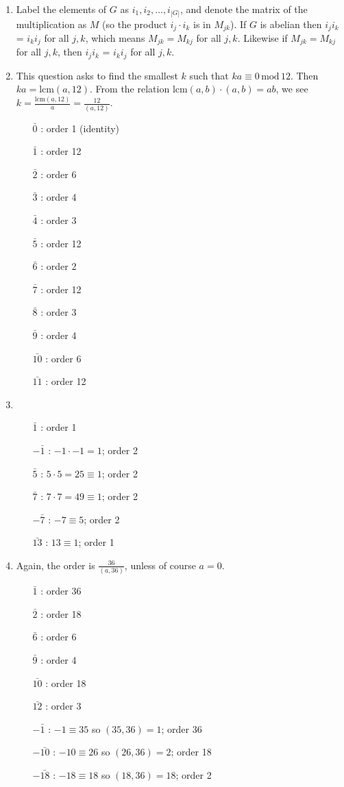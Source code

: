 \documentclass[]{article}
\newcommand{\abs}[1]{\left\vert #1 \right\vert}
\newcommand{\md}{\,\text{mod}\,}
\begin{document}
\begin{enumerate}
\item Label the elements of $G$ as $i_1, i_2, \ldots, i_{\abs{G}}$, and denote the matrix of the multiplication as $M$ (so the product $i_j\cdot i_k$ is in $M_{jk}$). If $G$ is abelian then $i_j i_k$ = $i_k i_j$ for all $j,k$, which means $M_{jk} = M_{kj}$ for all $j,k$. Likewise if $M_{jk} = M_{kj}$ for all $j,k$, then $i_j i_k$ = $i_k i_j$ for all $j,k$.


\item This question asks to find the smallest $k$ such that $ka \equiv 0\md{12}$. Then $ka = \text{lcm}(a,12)$. From the relation $\text{lcm}(a,b) \cdot (a,b) = ab$, we see $k = \frac{\text{lcm}(a,12)}{a} = \frac{12}{(a,12)}$.\begin{enumerate}
\item[$\bar{0}$]: order 1 (identity)
\item[$\bar{1}$]: order 12
\item[$\bar{2}$]: order 6
\item[$\bar{3}$]: order 4
\item[$\bar{4}$]: order 3
\item[$\bar{5}$]: order 12
\item[$\bar{6}$]: order 2
\item[$\bar{7}$]: order 12
\item[$\bar{8}$]: order 3
\item[$\bar{9}$]: order 4
\item[$\bar{10}$]: order 6
\item[$\bar{11}$]: order 12
\end{enumerate}


\item \begin{enumerate}
\item[$\bar{1}$]: order 1
\item[$-\bar{1}$]: $-1\cdot -1 = 1$; order 2
\item[$\bar{5}$]: $5\cdot 5 = 25 \equiv 1$; order 2
\item[$\bar{7}$]: $7\cdot 7 = 49 \equiv 1$; order 2
\item[$-\bar{7}$]: $-7 \equiv 5$; order 2
\item[$\bar{13}$]: $13 \equiv 1$; order 1
\end{enumerate}


\item Again, the order is $\frac{36}{(a,36)}$, unless of course $a=0$.\begin{enumerate}
\item[$\bar{1}$]: order 36
\item[$\bar{2}$]: order 18
\item[$\bar{6}$]: order 6
\item[$\bar{9}$]: order 4
\item[$\bar{10}$]: order 18
\item[$\bar{12}$]: order 3
\item[$-\bar{1}$]: $-1 \equiv 35$ so $(35,36) = 1$; order 36
\item[$-\bar{10}$]: $-10 \equiv 26$ so $(26,36) = 2$; order 18
\item[$-\bar{18}$]: $-18 \equiv 18$ so $(18,36) = 18$; order 2
\end{enumerate}



\end{enumerate}
\end{document}
